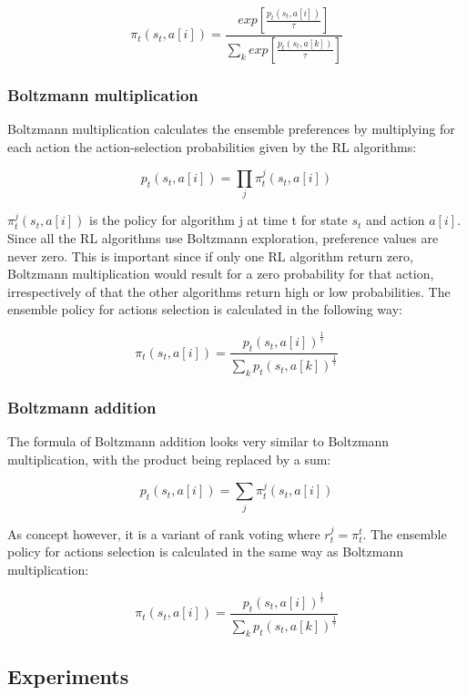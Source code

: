 \documentclass[letterpaper]{article}
\begin{document}
\[ \pi_t (s_t, a[i]) = \frac{exp[\frac{p_t(s_t, a[i])}{\tau}]}{\sum_k exp[\frac{p_t(s_t, a[k])}{\tau}]} \]

\subsubsection{Boltzmann
multiplication}\label{boltzmann-multiplication}

Boltzmann multiplication calculates the ensemble preferences by
multiplying for each action the action-selection probabilities given by
the RL algorithms:

\[ p_t(s_t, a[i]) = \prod_j \pi_t^j (s_t, a[i]) \]

\(\pi_t^j(s_t, a[i])\) is the policy for algorithm j at time t for state
\(s_t\) and action \(a[i]\). Since all the RL algorithms use Boltzmann
exploration, preference values are never zero. This is important since
if only one RL algorithm return zero, Boltzmann multiplication would
result for a zero probability for that action, irrespectively of that
the other algorithms return high or low probabilities. The ensemble
policy for actions selection is calculated in the following way:

\[ \pi_t (s_t, a[i]) = \frac{ p_t(s_t, a[i])^{\frac{1}{\tau}}}{\sum_k p_t(s_t, a[k])^{\frac{ 1 }{\tau}}} \]

\subsubsection{Boltzmann addition}\label{boltzmann-addition}

The formula of Boltzmann addition looks very similar to Boltzmann
multiplication, with the product being replaced by a sum:

\[ p_t(s_t, a[i]) = \sum_j \pi_t^j (s_t, a[i]) \]

As concept however, it is a variant of rank voting where $
r_t^{j}=\pi_t^{t} $. The ensemble policy for actions selection is
calculated in the same way as Boltzmann multiplication:

\[ \pi_t (s_t, a[i]) = \frac{ p_t(s_t, a[i])^{\frac{1}{\tau}}}{\sum_k p_t(s_t, a[k])^{\frac{ 1 }{\tau}}} \]

\subsection{Experiments}\label{experiments}
\end{document}
